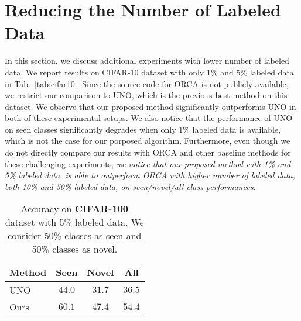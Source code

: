 \documentclass[runningheads]{eccv2022submission}
\begin{document}
\section{Reducing the Number of Labeled Data}
\label{sec:limited}
In this section, we discuss additional experiments with lower number of labeled data. We report results on CIFAR-10 dataset with only 1\% and 5\% labeled data in Tab.~\ref{tab:cifar10}. Since the source code for ORCA\cite{cao2022openworld} is not publicly available, we restrict our comparison to UNO\cite{fini2021unified}, which is the previous best method on this dataset. We observe that our proposed method significantly outperforms UNO in both of these experimental setups. We also notice that the performance of UNO on seen classes significantly degrades when only 1\% labeled data is available, which is not the case for our porposed algorithm. Furthermore, even though we do not directly compare our results with ORCA and other baseline methods for these challenging experiments, \emph{we notice that our proposed method with 1\% and 5\% labeled data, is able to outperform ORCA with higher number of labeled data, both 10\% and 50\% labeled data, on seen/novel/all class performances.}   

\begin{table}[h]
\vspace{-2mm}
\caption{Accuracy on \textbf{CIFAR-100}  dataset with  5\% labeled data. We consider 50\% classes as seen and 50\% classes as novel.}
\label{tab:cifar100}
\begin{center}\setlength{\tabcolsep}{4pt}
\small
\begin{tabular}{lccc}
\hline

\textbf{Method}  & \textbf{Seen} & \textbf{Novel} & \textbf{All}\\




\hline
UNO\cite{fini2021unified} & $44.0$ & $31.7$ & $36.5$\\
Ours & {\cellcolor{yellow!15}}${60.1}$ & {\cellcolor{yellow!15}}${47.4}$ & {\cellcolor{yellow!15}}${54.4}$\\\hline 



\end{tabular}
\end{center}


\vspace{-3mm}
\end{table}
\end{document}
